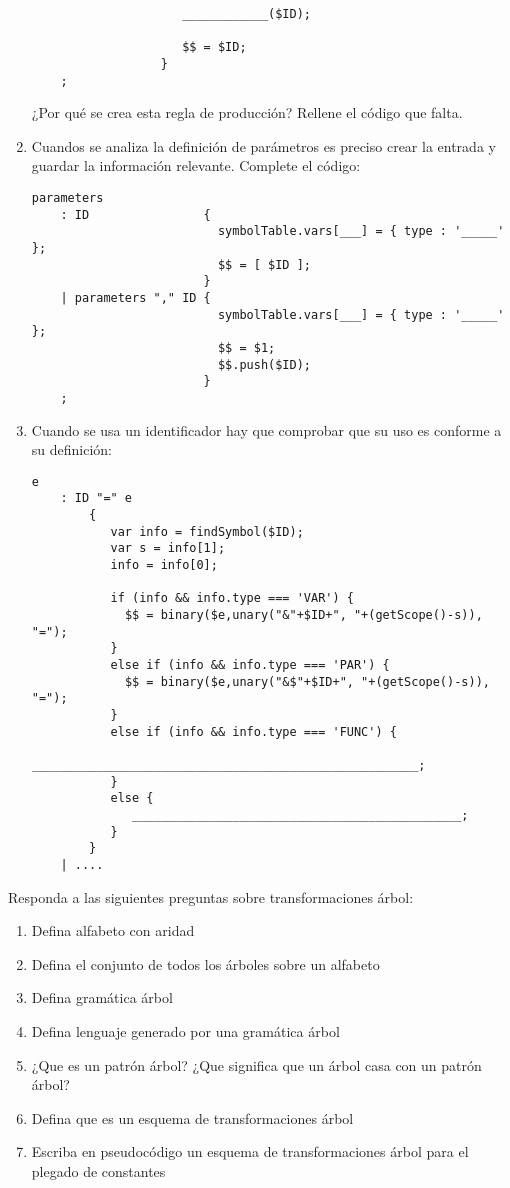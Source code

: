 \begin{enumerate}
\begin{verbatim}
                     ____________($ID);

                     $$ = $ID;
                  }
    ;
\end{verbatim}
¿Por qué se crea esta regla de producción? 
Rellene el código que falta.
\item 
Cuandos se analiza la definición de parámetros es preciso 
crear la entrada y guardar la información relevante. Complete 
el código:
\begin{verbatim}
parameters
    : ID                { 
                          symbolTable.vars[___] = { type : '_____' };
                          $$ = [ $ID ]; 
                        }
    | parameters "," ID { 
                          symbolTable.vars[___] = { type : '_____' };
                          $$ = $1; 
                          $$.push($ID); 
                        }
    ;
\end{verbatim}
\item  Cuando se usa un identificador hay que comprobar que su 
uso es conforme a su definición:
\begin{verbatim}
e
    : ID "=" e
        { 
           var info = findSymbol($ID);
           var s = info[1];
           info = info[0];

           if (info && info.type === 'VAR') { 
             $$ = binary($e,unary("&"+$ID+", "+(getScope()-s)), "=");
           }
           else if (info && info.type === 'PAR') { 
             $$ = binary($e,unary("&$"+$ID+", "+(getScope()-s)), "=");
           }
           else if (info && info.type === 'FUNC') { 
              ______________________________________________________;
           }
           else { 
              ______________________________________________;
           }
        }
    | ....
\end{verbatim}
\end{enumerate}
\item Responda a las siguientes preguntas sobre transformaciones árbol:
\begin{enumerate}
\item Defina alfabeto con aridad
\item Defina el conjunto de todos los árboles sobre un alfabeto
\item Defina gramática árbol
\item Defina lenguaje generado por una gramática árbol
\item ¿Que es un patrón árbol? ¿Que significa que un árbol casa con un patrón árbol?
\item Defina que es un esquema de transformaciones árbol
\item Escriba en pseudocódigo un esquema de transformaciones árbol 
para el plegado de constantes
\end{enumerate}


